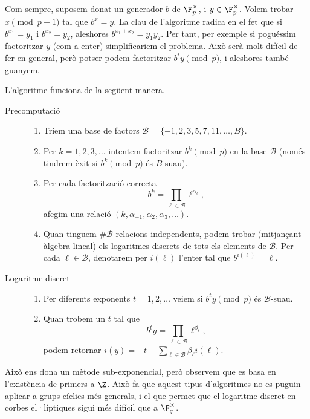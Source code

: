   Com sempre, suposem donat un generador $b$ de $\F_p^\times$, i $y\in\F_p^\times$. Volem trobar $x\pmod{p-1}$ tal que $b^x=y$. La clau de l'algoritme radica en el fet que si $b^{x_1}=y_1$ i $b^{x_2}=y_2$, aleshores $b^{x_1+x_2} = y_1y_2$. Per tant, per exemple si poguéssim factoritzar $y$ (com a enter) simplificariem el problema. Això serà molt difícil de fer en general, però potser podem factoritzar $b^t y\pmod p$, i aleshores també guanyem.
 
 L'algoritme funciona de la següent manera.

  \begin{description}
  \item[Precomputació]\hfill
  
    \begin{enumerate}
      \item Triem una base de factors $\mathcal B=\{-1,2,3,5,7,11,\ldots,B\}$.
      \item Per $k=1,2,3,\ldots$ intentem factoritzar $b^k\pmod p$ en la base $\mathcal B$ (només tindrem èxit si $b^k\pmod p$ és $B$-suau).
      \item Per cada factorització correcta
      \[
      b^k=\prod_{\ell\in \mathcal B} \ell^{\alpha_\ell},
      \]
      afegim una relació $(k,\alpha_{-1},\alpha_2,\alpha_3,\ldots)$.
      \item Quan tinguem $\#\mathcal B$ relacions independents, podem trobar (mitjançant àlgebra lineal) els logaritmes discrets de tots els elements de $\mathcal B$. Per cada $\ell\in\mathcal B$, denotarem per $i(\ell)$ l'enter tal que $b^{i(\ell)} = \ell$.
    \end{enumerate}
    \item[Logaritme discret]\hfill
    \begin{enumerate}
        \item Per diferents exponents $t=1,2,\ldots$ veiem si
        $b^t y\pmod p$ és $\mathcal{B}$-suau.
        \item Quan trobem un $t$ tal que
        \[
        b^t y = \prod_{\ell\in\mathcal B} \ell^{\beta_\ell},
        \]
        podem retornar $i(y) = -t + \sum_{\ell\in\mathcal{B}} \beta_\ell i(\ell)$.
    \end{enumerate}
  \end{description}

 Això ens dona un mètode sub-exponencial, però observem que es basa en l'existència de primers a $\Z$. Això fa que aquest tipus d'algoritmes no es puguin aplicar a grups cíclics més generals, i el que permet que el logaritme discret en corbes el·líptiques sigui més difícil que a $\F_q^\times$.